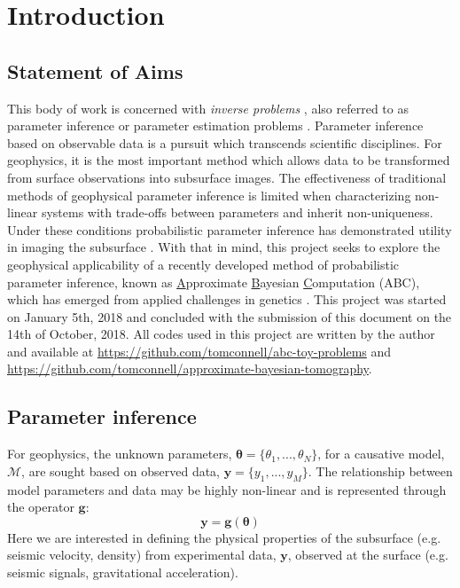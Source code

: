 \chapter{Introduction}


\section{Statement of Aims} 

This body of work is concerned with \textit{inverse problems} \citep{Tarantola2005,Aster2013,Menke2012,Kaipio2006,Biegler2010,Idier2013}, also referred to as parameter inference or parameter estimation problems \citep{Box1973,Sprott2008,Casella1993,Cox2007}. Parameter inference based on observable data is a pursuit which transcends scientific disciplines. For geophysics, it is the most important method which allows data to be transformed from surface observations into subsurface images. The effectiveness of traditional methods of geophysical parameter inference is limited when characterizing non-linear systems with trade-offs between parameters and inherit non-uniqueness. Under these conditions probabilistic parameter inference has demonstrated utility in imaging the subsurface \citep{Tarantola2005}. With that in mind, this project seeks to explore the geophysical applicability of a recently developed method of probabilistic parameter inference, known as \underline{A}pproximate \underline{B}ayesian \underline{C}omputation (ABC), which has emerged from applied challenges in genetics \citep{Tavare1997,Beaumont2002,Sunnaker2013}. This project was started on January 5th, 2018 and concluded with the submission of this document on the 14th of October, 2018. All codes used in this project are written by the author and available at \url{https://github.com/tomconnell/abc-toy-problems} and \url{https://github.com/tomconnell/approximate-bayesian-tomography}.

\section{Parameter inference}

For geophysics, the unknown parameters, $\bm{\theta} = \{\theta_1,...,\theta_N\}$, for a causative model, $\mathcal{M}$, are sought based on observed data, $\bm{y} = \{y_1,...,y_M\}$. The relationship between model parameters and data may be highly non-linear and is represented through the operator $\bm{g}$:
\begin{equation}
\bm{y} = \bm{g}(\bm{\theta})
\label{basic_data_parameters}
\end{equation}
Here we are interested in defining the physical properties of the subsurface (e.g. seismic velocity, density) from experimental data, $\bm{y}$, observed at the surface (e.g. seismic signals, gravitational acceleration). 


